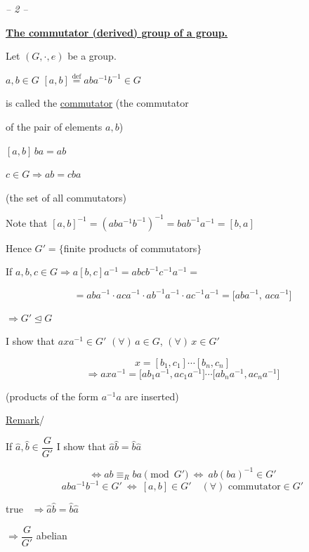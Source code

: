 \documentclass[12pt]{article}
\begin{document}
\begin{center}
\textit{-- 2 --}
\end{center}

\noindent\underline{\textbf{The commutator (derived) group of a group.}}

\bigskip
\noindent Let $(G,\cdot,e)$ be a group.

\noindent $a,b\in G$ \quad $[a,b] \overset{\text{def}}{=} aba^{-1}b^{-1}\in G$

\noindent is called the \underline{commutator} (the commutator

\noindent of the pair of elements $a,b$)

\bigskip
\noindent $[a,b]\,ba = ab$

\noindent $c\in G \Rightarrow ab=cba$

\bigskip
\noindent{} \quad (the set of all commutators)

\bigskip
\noindent Note that $[a,b]^{-1} = (aba^{-1}b^{-1})^{-1} = bab^{-1}a^{-1} = [b,a]$

\noindent Hence $G' = \{$finite products of commutators$\}$

\bigskip
\noindent If $a,b,c\in G \Rightarrow a[b,c]a^{-1} = abcb^{-1}c^{-1}a^{-1} =$

\[
= aba^{-1}\cdot aca^{-1}\cdot ab^{-1}a^{-1}\cdot ac^{-1}a^{-1} = \big[aba^{-1},\,aca^{-1}\big]
\]

\noindent $\Rightarrow G'\trianglelefteq G$

\bigskip
\noindent I show that $axa^{-1}\in G'$ $(\forall)\,a\in G$, $(\forall)\,x\in G'$

\[
x=[b_1,c_1]\cdots[b_n,c_n]
\]
\[
\Rightarrow axa^{-1} = \big[ab_1a^{-1},ac_1a^{-1}\big]\cdots\big[ab_na^{-1},ac_na^{-1}\big]
\]

\noindent (products of the form $a^{-1}a$ are inserted)

\bigskip
\noindent\underline{Remark}/ \quad {}

\bigskip
\noindent If $\hat a,\hat b\in \dfrac{G}{G'}$ I show that $\hat a\hat b=\hat b\hat a$

\[
\Leftrightarrow ab\equiv_{R} ba \pmod{G'} \ \Leftrightarrow \ ab(ba)^{-1}\in G'
\]
\[
aba^{-1}b^{-1}\in G' \ \Leftrightarrow \ [a,b]\in G' \quad (\forall)\text{ commutator}\in G'
\]

\noindent true \ $\Rightarrow \hat a\hat b=\hat b\hat a$

\noindent $\Rightarrow \dfrac{G}{G'}$ abelian
\end{document}
